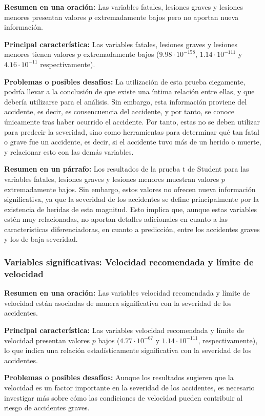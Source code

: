 \documentclass{book}
\begin{document}
\textbf{Resumen en una oración:} Las variables fatales, lesiones graves y lesiones menores presentan valores $p$ extremadamente bajos pero no aportan nueva información.

\textbf{Principal característica:} 
Las variables fatales, lesiones graves y lesiones menores tienen valores $p$ extremadamente bajos ($9.98 \cdot 10^{-158}$, $1.14 \cdot 10^{-111}$ y $4.16 \cdot 10^{-11}$ respectivamente).

\textbf{Problemas o posibles desafíos:} La utilización de esta prueba ciegamente, podría llevar a la conclusión de que existe una íntima relación entre ellas, y que debería utilizarse para el análisis. Sin embargo, esta información proviene del accidente, es decir, es consencuencia del accidente, y por tanto, se conoce únicamente tras haber ocurrido el accidente. Por tanto, estas no se deben utilizar para predecir la severidad, sino como herramientas para determinar qué tan fatal o grave fue un accidente, es decir, si el accidente tuvo más de un herido o muerte, y relacionar esto con las demás variables.

\textbf{Resumen en un párrafo:} Los resultados de la prueba t de Student para las variables fatales, lesiones graves y lesiones menores muestran valores $p$ extremadamente bajos. Sin embargo, estos valores no ofrecen nueva información significativa, ya que la severidad de los accidentes se define principalmente por la existencia de heridas de esta magnitud. Esto implica que, aunque estas variables estén muy relacionadas, no aportan detalles adicionales en cuanto a las características diferenciadoras, en cuanto a predicción, entre los accidentes graves y los de baja severidad.

\subsubsection{Variables significativas: Velocidad recomendada y límite de velocidad}
\textbf{Resumen en una oración:} Las variables velocidad recomendada y límite de velocidad están asociadas de manera significativa con la severidad de los accidentes.

\textbf{Principal característica:} Las variables velocidad recomendada y límite de velocidad presentan valores $p$ bajos ($4.77 \cdot 10^{-67}$ y $1.14 \cdot 10^{-111}$, respectivamente), lo que indica una relación estadísticamente significativa con la severidad de los accidentes.

\textbf{Problemas o posibles desafíos:} Aunque los resultados sugieren que la velocidad es un factor importante en la severidad de los accidentes, es necesario investigar más sobre cómo las condiciones de velocidad pueden contribuir al riesgo de accidentes graves.
\end{document}

